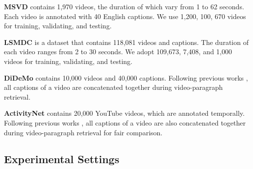 \documentclass[sigconf]{acmart}
\begin{document}
\noindent\textbf{MSVD}
 \cite{chen2011collecting} contains 1,970 videos, the duration of which vary from 1 to 62 seconds. Each video is annotated with 40 English captions. We use 1,200, 100, 670 videos for training, validating, and testing. 

\noindent\textbf{LSMDC} \cite{rohrbach2015long} is a dataset that contains 118,081 videos and captions. The duration of each video ranges from 2 to 30 seconds. We adopt 109,673, 7,408, and 1,000 videos for training, validating, and testing.

\noindent\textbf{DiDeMo}  \cite{anne2017localizing} contains 10,000 videos and 40,000 captions. Following previous works \cite{liu2019use,lei2021less,bain2021frozen}, all captions of a video are concatenated together during video-paragraph retrieval.

\noindent\textbf{ActivityNet} \cite{caba2015activitynet} contains 20,000 YouTube videos, which are annotated temporally. Following previous works \cite{luo2021clip4clip,sun2019learning,gabeur2020multi}, all captions of a video are also concatenated together during video-paragraph retrieval for fair comparison.




\subsection{Experimental Settings}
\end{document}
